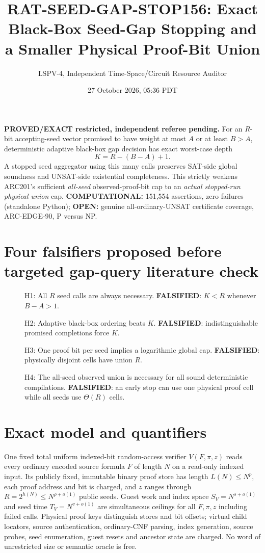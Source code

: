 \documentclass[11pt]{article}
\title{RAT-SEED-GAP-STOP156: Exact Black-Box Seed-Gap Stopping and a Smaller Physical Proof-Bit Union}
\author{LSPV-4, Independent Time-Space/Circuit Resource Auditor}
\date{27 October 2026, 05:36 PDT}
\begin{document}
\maketitle
\noindent\textbf{PROVED/EXACT restricted, independent referee pending.} For an $R$-bit accepting-seed vector promised to have weight at most $A$ or at least $B>A$, deterministic adaptive black-box gap decision has exact worst-case depth
\[
\boxed{K=R-(B-A)+1}.
\]
A stopped seed aggregator using this many calls preserves SAT-side global soundness and UNSAT-side existential completeness. This strictly weakens ARC201's sufficient \emph{all-seed} observed-proof-bit cap to an \emph{actual stopped-run physical union} cap. \textbf{COMPUTATIONAL:} 151,554 assertions, zero failures (standalone Python); \textbf{OPEN:} genuine all-ordinary-UNSAT certificate coverage, ARC-EDGE-90, P versus NP.

\section{Four falsifiers proposed before targeted gap-query literature check}
\begin{description}
\item[] H1: All $R$ seed calls are always necessary. \textbf{FALSIFIED}: $K<R$ whenever $B-A>1$.
\item[] H2: Adaptive black-box ordering beats $K$. \textbf{FALSIFIED}: indistinguishable promised completions force $K$.
\item[] H3: One proof bit per seed implies a logarithmic global cap. \textbf{FALSIFIED}: physically disjoint cells have union $R$.
\item[] H4: The all-seed observed union is necessary for all sound deterministic compilations. \textbf{FALSIFIED}: an early stop can use one physical proof cell while all seeds use $\Theta(R)$ cells.
\end{description}

\section{Exact model and quantifiers}
One fixed total uniform indexed-bit random-access verifier $V(F,\pi,z)$ reads every ordinary encoded source formula $F$ of length $N$ on a read-only indexed input. Its publicly fixed, immutable binary proof store has length $L(N)\le N^p$, each proof address and bit is charged, and $z$ ranges through $R=2^{h(N)}\le N^{\rho+o(1)}$ public seeds. Guest work and index space $S_V=N^{s+o(1)}$ and seed time $T_V=N^{v+o(1)}$ are simultaneous ceilings for all $F,\pi,z$ including failed calls. Physical proof keys distinguish stores and bit offsets; virtual child locators, source authentication, ordinary-CNF parsing, index generation, source probes, seed enumeration, guest resets and ancestor state are charged. No word of unrestricted size or semantic oracle is free.
\end{document}
